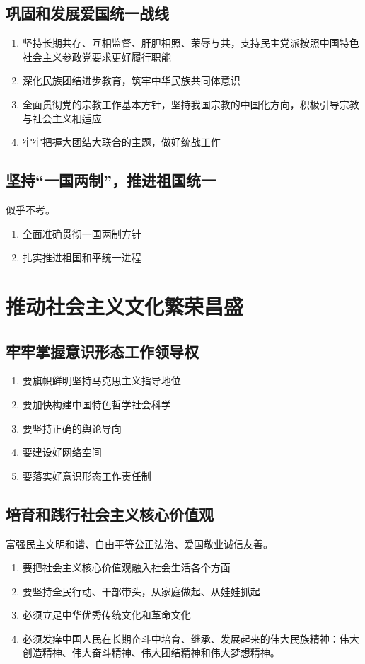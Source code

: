     \subsection{巩固和发展爱国统一战线}
        \begin{enumerate}
            \item 坚持长期共存、互相监督、肝胆相照、荣辱与共，支持民主党派按照中国特色社会主义参政党要求更好履行职能
            \item 深化民族团结进步教育，筑牢中华民族共同体意识
            \item 全面贯彻党的宗教工作基本方针，坚持我国宗教的中国化方向，积极引导宗教与社会主义相适应
            \item 牢牢把握大团结大联合的主题，做好统战工作
        \end{enumerate}

    \subsection{坚持“一国两制”，推进祖国统一}
        似乎不考。
        \begin{enumerate}
            \item 全面准确贯彻一国两制方针
            \item 扎实推进祖国和平统一进程
        \end{enumerate}


\section{推动社会主义文化繁荣昌盛}
    \subsection{牢牢掌握意识形态工作领导权}
        \begin{enumerate}
            \item 要旗帜鲜明坚持马克思主义指导地位
            \item 要加快构建中国特色哲学社会科学
            \item 要坚持正确的舆论导向
            \item 要建设好网络空间
            \item 要落实好意识形态工作责任制
        \end{enumerate}

    \subsection{培育和践行社会主义核心价值观}
        富强民主文明和谐、自由平等公正法治、爱国敬业诚信友善。
        \begin{enumerate}
            \item 要把社会主义核心价值观融入社会生活各个方面
            \item 要坚持全民行动、干部带头，从家庭做起、从娃娃抓起
            \item 必须立足中华优秀传统文化和革命文化
            \item 必须发痒中国人民在长期奋斗中培育、继承、发展起来的伟大民族精神：伟大创造精神、伟大奋斗精神、伟大团结精神和伟大梦想精神。
        \end{enumerate}

